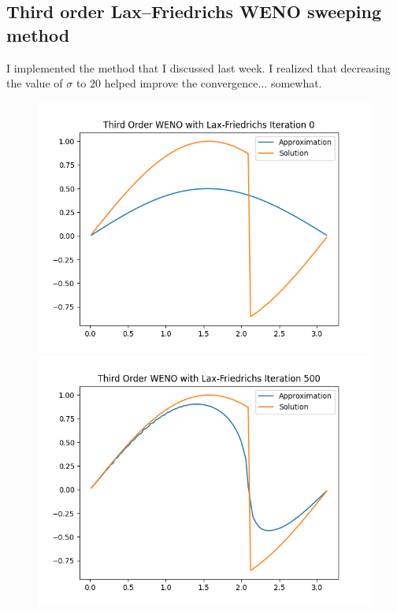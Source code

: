 \documentclass{article}
\begin{document}
\subsection{Third order Lax–Friedrichs WENO sweeping method}
I implemented the method that I discussed last week. I realized that decreasing the value of $\sigma$ to $20$ helped improve the convergence... somewhat. 
\begin{figure}[t!]
    \centering
    \begin{minipage}{.48\textwidth}
        \centering
        \includegraphics[width=0.9\linewidth]{imgs/output_weno3_lf/plot_0.png}
    \end{minipage}%
    \begin{minipage}{.48\textwidth}
        \centering
        \includegraphics[width=0.9\linewidth]{imgs/output_weno3_lf/plot_500.png}

\end{minipage}
\end{figure}
\end{document}
